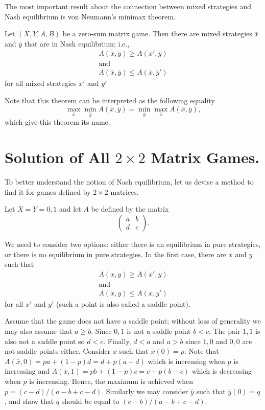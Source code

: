 The most important result about the connection between mixed strategies and Nash
equilibrium is von Neumann's minimax theorem.
\begin{theorem}
\label{theorem:von-neumanns-minimax}
  Let $(X, Y, A, B)$ be a zero-sum matrix game. Then there are mixed
  strategies $\bar{x}$ and $\bar{y}$ that are in Nash equilibrium; i.e., 
  \begin{gather*}
    A(\bar{x}, \bar{y}) \ge A(\bar{x}', \bar{y}) \\
    \text{and} \\
    A(\bar{x}, \bar{y}) \le A(\bar{x}, \bar{y}')
  \end{gather*}
  for all mixed strategies $\bar{x}'$ and $\bar{y}'$
\end{theorem}
Note that this theorem can be interpreted as the following equality 
\[
  \max_{\bar{x}} \min_{\bar{y}} A(\bar{x}, \bar{y}) = 
  \min_{\bar{y}} \max_{\bar{x}} A(\bar{x}, \bar{y}),
\]
which give this theorem its name.

\section{Solution of All $2 \times 2$ Matrix Games.}
To better understand the notion of Nash equilibrium, let us devise a method to
find it for games defined by $2 \times 2$ matrices.

Let $X = Y = 0, 1$ and let $A$ be defined by the matrix 
\[
  \begin{pmatrix}
    a & b \\
    d & c
  \end{pmatrix}.
\]

We need to consider two options: either there is an equilibrium in pure
strategies, or there is no equilibrium in pure strategies.
In the first case, there are $x$ and $y$ such that 
\begin{gather*}
  A(x, y) \ge A(x', y) \\
  \text{and} \\
  A(x, y) \le A(x, y') 
\end{gather*}
for all $x'$ and $y'$ (such a point is also called a saddle point).

Assume that the game does not have a saddle point; without loss of generality we
may also assume that $a \ge b$. Since $0, 1$ is not a saddle point $b < c$.
The pair $1, 1$ is also not a saddle point so $d < c$. Finally, $d < a$ and $a >
b$ since $1, 0$ and $0, 0$ are not saddle points either. Consider $\bar{x}$ such
that $\bar{x}(0) = p$. Note that $A(\bar{x}, 0) =  p a + (1 - p) d = 
d + p (a - d)$ which is increasing when $p$ is increasing and 
$A(\bar{x}, 1) =  p b + (1 - p) c = c + p (b - c)$ which is decreasing when $p$
is increasing. Hence, the maximum is achieved when 
$p = (c - d) / (a - b + c - d)$. Similarly we may consider $\bar{y}$ such that
$\bar{y}(0) = q$, and show that $q$ should be equal to 
$(c - b) / (a - b + c - d)$.
